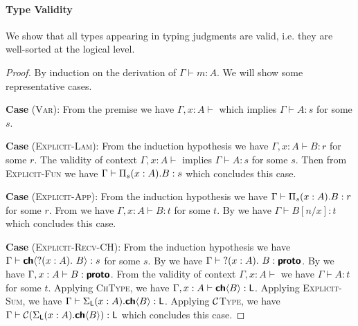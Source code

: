 

\paragraph{\textbf{Type Validity}}
We show that all types appearing in typing judgments are valid, i.e. they are well-sorted
at the logical level.

\begin{proof}
  By induction on the derivation of $\Gamma \vdash m : A$. We will show some representative cases.

\textbf{Case} (\textsc{Var}): 
  From the premise we have $\Gamma, x : A \vdash$ which implies $\Gamma \vdash A : s$ for some $s$.

\textbf{Case} (\textsc{Explicit-Lam}):
  From the induction hypothesis we have $\Gamma, x : A \vdash B : r$ for some $r$.
  The validity of context $\Gamma, x : A \vdash$ implies $\Gamma \vdash A : s$ for some $s$.
  Then from \textsc{Explicit-Fun} we have $\Gamma \vdash \Pi_{s}({x : A}).{B} : s$ which concludes this case.

\textbf{Case} (\textsc{Explicit-App}):
  From the induction hypothesis we have $\Gamma \vdash \Pi_{s}({x : A}).{B} : r$ for some $r$.
  From  we have $\Gamma, x : A \vdash B : t$ for some $t$.
  By  we have $\Gamma \vdash B[n/x] : t$ which concludes this case.

\textbf{Case} (\textsc{Explicit-Recv-CH}):
  From the induction hypothesis we have $\Gamma \vdash {\textbf{\textsf{ch}}\langle{{{?}({x : A}).\ {B}}}\rangle} : s$ for some $s$.
  By  we have $\Gamma \vdash {{?}({x : A}).\ {B}} : \textbf{\textsf{proto}}$.
  By  we have $\Gamma, x : A \vdash B : \textbf{\textsf{proto}}$.
  From the validity of context $\Gamma, x : A \vdash$ we have $\Gamma \vdash A : t$ for some $t$.
  Applying \textsc{ChType}, we have $\Gamma, x : A \vdash {\textbf{\textsf{ch}}\langle{B}\rangle} : \textsf{L}$.
  Applying \textsc{Explicit-Sum}, we have $\Gamma \vdash \Sigma_{\textsf{L}}({x : A}).{{\textbf{\textsf{ch}}\langle{B}\rangle}} : \textsf{L}$.
  Applying \textsc{$\mathcal{C}$Type}, we have $\Gamma \vdash \mathcal{C}({\Sigma_{\textsf{L}}({x : A}).{{\textbf{\textsf{ch}}\langle{B}\rangle}}}) : \textsf{L}$ which concludes this case.
\end{proof}

